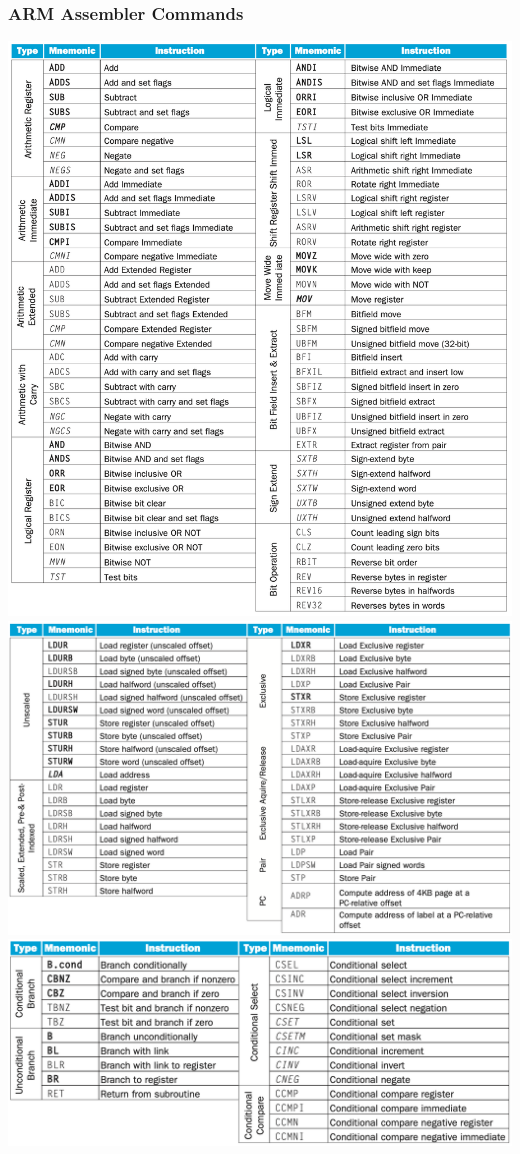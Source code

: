 \documentclass[a4paper]{scrartcl}
\begin{document}
        \subsubsection{ARM Assembler Commands}
        \centering\includegraphics[scale=0.25]{arm_assembler1.png}
        \centering\includegraphics[scale=0.25]{arm_assembler2.png}
        \centering\includegraphics[scale=0.3]{arm_assembler3.png} 
\end{document}
